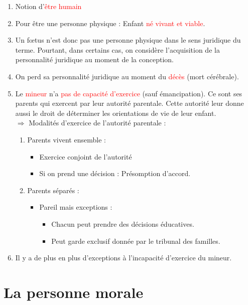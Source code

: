 \begin{enumerate}
    \item Notion d'\textcolor{red}{être humain}
    \item Pour être une personne physique : Enfant \textcolor{red}{né vivant et viable}.
    \item Un fœtus n'est donc pas une personne physique dans le sens juridique du terme. Pourtant, dans certains cas, on considère l'acquisition de la personnalité juridique au moment de la conception.
    \item On perd sa personnalité juridique au moment du \textcolor{red}{décès} (mort cérébrale).
    \item Le \textcolor{red}{mineur} n'a \textcolor{red}{pas de capacité d'exercice} (sauf émancipation). Ce sont ses parents qui exercent par leur autorité parentale. Cette autorité leur donne aussi le droit de déterminer les orientations de vie de leur enfant. \\
    $\Rightarrow$ Modalités d'exercice de l'autorité parentale :
    \begin{enumerate}
        \item Parents vivent ensemble :
        \begin{itemize}
            \item Exercice conjoint de l'autorité
            \item Si on prend une décision : Présomption d'accord.
        \end{itemize}
        \item Parents séparés :
        \begin{itemize}
            \item Pareil mais exceptions :
            \begin{itemize}
                \item Chacun peut prendre des décisions éducatives.
                \item Peut garde exclusif donnée par le tribunal des familles.
             \end{itemize} 
        \end{itemize}
    \end{enumerate}
    \item Il y a de plus en plus d'exceptions à l'incapacité d'exercice du mineur.
\end{enumerate}

\section{La personne morale}

